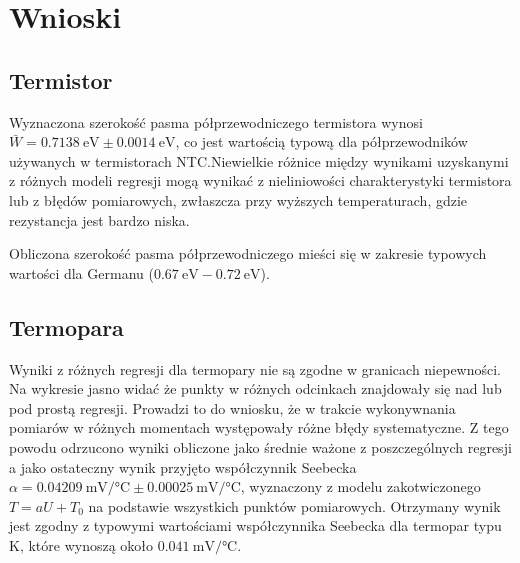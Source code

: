 \documentclass[12pt, a4paper]{article}
\begin{document}
\section{Wnioski}
\subsection{Termistor}
Wyznaczona szerokość pasma półprzewodniczego termistora wynosi $\bar{W} =
    \SI{0.7138}{\electronvolt} \pm \SI{0.0014}{\electronvolt}$, co jest wartością
typową dla półprzewodników używanych w termistorach NTC.\@ Niewielkie różnice
między wynikami uzyskanymi z różnych modeli regresji mogą wynikać z
nieliniowości charakterystyki termistora lub z błędów pomiarowych, zwłaszcza
przy wyższych temperaturach, gdzie rezystancja jest bardzo niska.

Obliczona szerokość pasma półprzewodniczego mieści się w zakresie typowych
wartości dla Germanu ($ \SI{0.67}{\electronvolt} - \SI{0.72}{\electronvolt} $).

\subsection{Termopara}
Wyniki z różnych regresji dla termopary nie są zgodne w granicach niepewności. Na wykresie jasno widać że punkty w różnych odcinkach znajdowały się nad lub pod prostą regresji. Prowadzi to do wniosku, że w trakcie wykonywnania pomiarów w różnych momentach występowały różne błędy systematyczne. Z tego powodu odrzucono wyniki obliczone jako średnie ważone z poszczególnych regresji a jako ostateczny wynik przyjęto współczynnik Seebecka $\alpha = \SI{0.04209}{\milli\volt\per\degreeCelsius} \pm \SI{0.00025}{\milli\volt\per\degreeCelsius}$, wyznaczony z modelu zakotwiczonego $T = aU + T_0$ na podstawie wszystkich punktów pomiarowych. Otrzymany wynik jest zgodny z typowymi wartościami współczynnika Seebecka dla termopar typu K, które wynoszą około $\SI{0.041}{\milli\volt\per\degreeCelsius}$.
\end{document}
